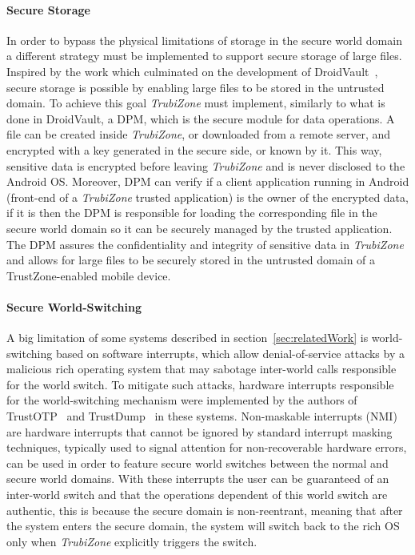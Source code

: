 \paragraph{\textbf{Secure Storage}}

In order to bypass the physical limitations of storage in the secure world domain a different strategy must be implemented to support secure storage of large files. Inspired by the work which culminated on the development of DroidVault~\cite{li2014droidvault}, secure storage is possible by enabling large files to be stored in the untrusted domain. To achieve this goal \emph{TrubiZone} must implement, similarly to what is done in DroidVault, a \ac{DPM}, which is the secure module for data operations. A file can be created inside \emph{TrubiZone}, or downloaded from a remote server, and encrypted with a key generated in the secure side, or known by it. This way, sensitive data is encrypted before leaving \emph{TrubiZone} and is never disclosed to the Android OS. Moreover, \ac{DPM} can verify if a client application running in Android (front-end of a \emph{TrubiZone} trusted application) is the owner of the encrypted data, if it is then the \ac{DPM} is responsible for loading the corresponding file in the secure world domain so it can be securely managed by the trusted application. The \ac{DPM} assures the confidentiality and integrity of sensitive data in \emph{TrubiZone} and allows for large files to be securely stored in the untrusted domain of a TrustZone-enabled mobile device.

\paragraph{\textbf{Secure World-Switching}}

A big limitation of some systems described in section~\ref{sec:relatedWork} is world-switching based on software interrupts, which allow denial-of-service attacks by a malicious rich operating system that may sabotage inter-world calls responsible for the world switch. To mitigate such attacks, hardware interrupts responsible for the world-switching mechanism were implemented by the authors of TrustOTP~\cite{sun2015trustotp} and TrustDump~\cite{sun2015reliable} in these systems. Non-maskable interrupts (NMI) are hardware interrupts that cannot be ignored by standard interrupt masking techniques, typically used to signal attention for non-recoverable hardware errors, can be used in order to feature secure world switches between the normal and secure world domains. With these interrupts the user can be guaranteed of an inter-world switch and that the operations dependent of this world switch are authentic, this is because the secure domain is non-reentrant, meaning that after the system enters the secure domain, the system will switch back to the rich OS only when \emph{TrubiZone} explicitly triggers the switch.

